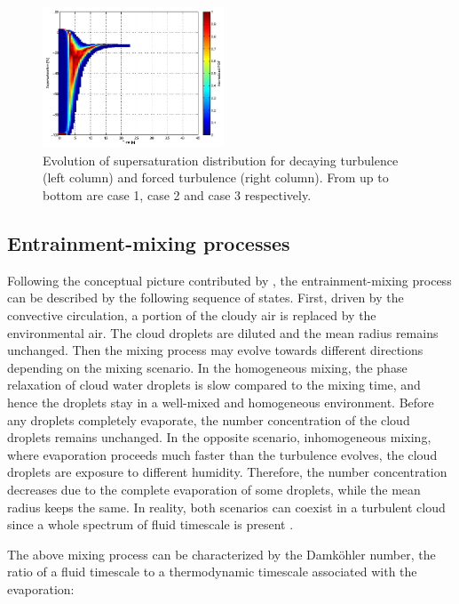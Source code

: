 \begin{figure}[!htbp]
\includegraphics[width=0.48\textwidth]{Figures/pdf_supersat_f3}
\caption{Evolution of supersaturation distribution for decaying turbulence
(left column) and forced turbulence (right column). From up to bottom are case
1, case 2 and case 3 respectively.}\label{fig:supersat_distri} \end{figure}

\subsection{Entrainment-mixing processes}
Following the conceptual picture contributed by \cite{Krueger1997Modeling,Grabowski1993Cumulus, Burnet2007Observational}, 
the entrainment-mixing process can be described by the following sequence of states.  
First, driven by the convective circulation, a portion of the cloudy air is replaced 
by the environmental air. The cloud droplets are diluted and the mean radius remains 
unchanged. Then the mixing process may evolve towards different directions depending on the mixing 
scenario. In the homogeneous mixing, the phase relaxation of cloud water droplets is 
slow compared to the mixing time, and hence the droplets stay in a well-mixed and 
homogeneous environment. Before any droplets completely evaporate, the number concentration 
of the cloud droplets remains unchanged. In the opposite scenario, inhomogeneous 
mixing, where evaporation proceeds much faster than the turbulence evolves, 
the cloud droplets are exposure to different humidity. Therefore, the number concentration 
decreases due to the complete evaporation of some droplets, while the mean radius
keeps the same. In reality, both scenarios can coexist in a turbulent cloud since 
a whole spectrum of fluid timescale is present \cite{Lehmann2009}.

The above mixing process can be characterized by the Damk{\"o}hler number, the ratio of 
a fluid timescale to a thermodynamic timescale associated with the evaporation:

